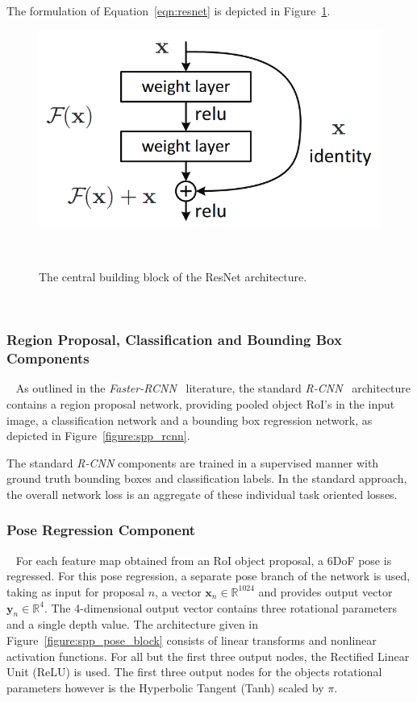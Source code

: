 The formulation of Equation~\ref{eqn:resnet} is depicted in Figure~\ref{figure:resnet_block}.
\begin{figure}[!htbp]
  \centering
  \includegraphics[width=.6\linewidth]{figures/spp/residual_block_he.png}
  \caption[ResNet Block]{The central building block of the ResNet architecture.\footnotemark}
~\label{figure:resnet_block}
\end{figure}
~

\subsubsection{Region Proposal, Classification and Bounding Box Components}
~\label{subsub:spp_neural_rpn}
As outlined in the \textit{Faster-RCNN}~\cite{He2017} literature, the standard 
\textit{R-CNN}~\cite{Girshick2014,Girshick2015_2} architecture contains a region proposal 
network, providing pooled object RoI's in the input image, a classification network and 
a bounding box regression network, as depicted in Figure~\ref{figure:spp_rcnn}.

The standard \textit{R-CNN} components are trained in a supervised manner with ground truth 
bounding boxes and classification labels. In the standard approach, the overall network loss 
is an aggregate of these individual task oriented losses.

\subsubsection{Pose Regression Component}
~\label{subsub:spp_neural_pose}
For each feature map obtained from an RoI object proposal, a 6DoF pose is regressed. For this 
pose regression, a separate pose branch of the network is used, taking as input for proposal \( n \), 
a vector \( \bm{x}_{n} \in \mathbb{R}^{1024} \) and provides output vector \( \bm{y}_{n} \in \mathbb{R}^{4} \). 
The 4-dimensional output vector contains three rotational parameters and a single depth value. The architecture 
given in Figure~\ref{figure:spp_pose_block} consists of linear transforms and nonlinear activation functions. 
For all but the first three output nodes, the Rectified Linear Unit (ReLU) is used. The first three output 
nodes for the objects rotational parameters however is the Hyperbolic Tangent (Tanh) scaled by \( \pi \).

